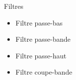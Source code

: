 \begin{frame}{Filtres}
	\begin{itemize}
		\item Filtre passe-bas
		\item Filtre passe-bande
		\item Filtre passe-haut
		\item Filtre coupe-bande
	\end{itemize}
\end{frame}
